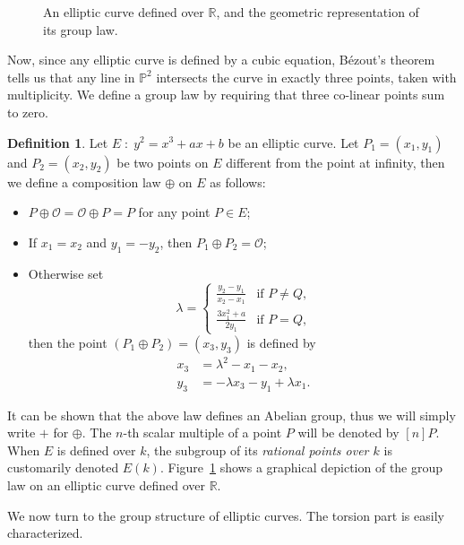 \documentclass[10pt]{article}
\theoremstyle{plain}
\theoremstyle{definition}
\newtheorem{definition}[theorem]{Definition}
\def\P{\ensuremath{\mathbb{P}}}
\def\O{\ensuremath{\mathcal{O}}}
\begin{document}
\begin{figure}
  \hfill
  \strut
  
  \caption{An elliptic curve defined over $ℝ$, and the geometric
    representation of its group law.}
  \label{fig:weierstrass}
\end{figure}

Now, since any elliptic curve is defined by a cubic equation, Bézout's
theorem tells us that any line in $\P^2$ intersects the curve in
exactly three points, taken with multiplicity. %
We define a group law by requiring that three co-linear points sum to
zero. %

\begin{definition}
  Let $E\;:\;y^2=x^3+ax+b$ be an elliptic curve. Let $P_1=(x_1,y_1)$
  and $P_2=(x_2,y_2)$ be two points on $E$ different from the point at
  infinity, then we define a composition law $⊕$ on $E$ as
  follows:
  \begin{itemize}
  \item $P ⊕ \O = \O ⊕ P = P$ for any point $P∈E$;
  \item If $x_1=x_2$ and $y_1=-y_2$, then $P_1⊕P_2 = \O$;
  \item Otherwise set
    \[λ =
      \begin{cases}
        \frac{y_2-y_1}{x_2-x_1} &\text{if $P≠Q$,}\\
        \frac{3x_1^2+a}{2y_1} &\text{if $P=Q$,}
      \end{cases}
    \]
    then the point $(P_1⊕P_2)=(x_3,y_3)$ is defined by
    \begin{align*}
      x_3 &= λ^2 - x_1 - x_2,\\
      y_3 &= -λx_3 - y_1 + λx_1.
    \end{align*}
  \end{itemize}
\end{definition}

It can be shown that the above law defines an Abelian group, thus we
will simply write $+$ for $⊕$. %
The $n$-th scalar multiple of a point $P$ will be denoted by $[n]P$. %
When $E$ is defined over $k$, the subgroup of its \emph{rational
  points over $k$} is customarily denoted $E(k)$. %
Figure~\ref{fig:weierstrass} shows a graphical depiction of the group
law on an elliptic curve defined over $ℝ$.

We now turn to the group structure of elliptic curves. %
The torsion part is easily characterized.
\end{document}
